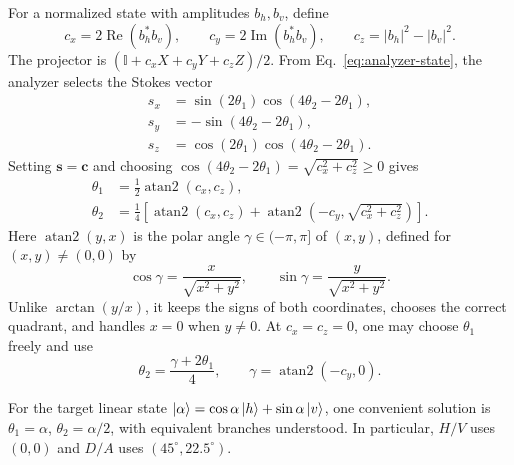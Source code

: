 \documentclass[a4paper,10pt]{article}
\newcommand{\I}{\mathbb{I}}
\begin{document}
For a normalized state with amplitudes $b_h,b_v$, define
\begin{equation}
    c_x=2\operatorname{Re}(b_h^*b_v),\qquad
    c_y=2\operatorname{Im}(b_h^*b_v),\qquad
    c_z=|b_h|^2-|b_v|^2.
    \label{eq:stokes-definition}
\end{equation}
The projector is $(\I+c_xX+c_yY+c_zZ)/2$. From
Eq.~\eqref{eq:analyzer-state}, the analyzer selects the Stokes vector
\begin{equation}
    \begin{aligned}
        s_x&=\sin(2\theta_1)\cos(4\theta_2-2\theta_1),\\
        s_y&=-\sin(4\theta_2-2\theta_1),\\
        s_z&=\cos(2\theta_1)\cos(4\theta_2-2\theta_1).
    \end{aligned}
    \label{eq:analyzer-stokes}
\end{equation}
Setting $\boldsymbol s=\boldsymbol c$ and choosing
$\cos(4\theta_2-2\theta_1)=\sqrt{c_x^2+c_z^2}\geq0$ gives
\begin{equation}
    \boxed{
    \begin{aligned}
        \theta_1&=\frac12\operatorname{atan2}(c_x,c_z),\\[3pt]
        \theta_2&=\frac14\left[
            \operatorname{atan2}(c_x,c_z)
            +\operatorname{atan2}\!\left(-c_y,\sqrt{c_x^2+c_z^2}\right)
        \right].
    \end{aligned}}
    \label{eq:compensation-angles}
\end{equation}
Here $\operatorname{atan2}(y,x)$ is the polar angle
$\gamma\in(-\pi,\pi]$ of $(x,y)$, defined for $(x,y)\neq(0,0)$ by
\begin{equation}
    \cos\gamma=\frac{x}{\sqrt{x^2+y^2}},
    \qquad
    \sin\gamma=\frac{y}{\sqrt{x^2+y^2}}.
\end{equation}
Unlike $\arctan(y/x)$, it keeps the signs of both coordinates, chooses the
correct quadrant, and handles $x=0$ when $y\neq0$.
At $c_x=c_z=0$, one may choose $\theta_1$ freely and use
\begin{equation}
    \theta_2=\frac{\gamma+2\theta_1}{4},
    \qquad \gamma=\operatorname{atan2}(-c_y,0).
\end{equation}

For the target linear state
$\ket{\alpha}=\cos\alpha\ket h+\sin\alpha\ket v$, one convenient solution
is $\theta_1=\alpha$, $\theta_2=\alpha/2$, with equivalent branches
understood. In particular, $H/V$ uses $(0,0)$ and $D/A$ uses
$(45^\circ,22.5^\circ)$.
\end{document}
